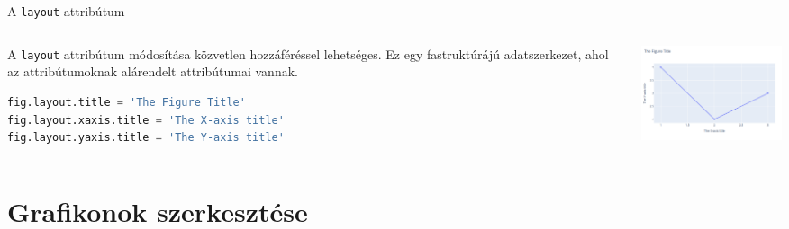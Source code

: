 \documentclass[english, aspectratio=169]{beamer}
\makeatletter
\let\origtableofcontents=\tableofcontents
\def\tableofcontents{\@ifnextchar[{\origtableofcontents}{\gobbletableofcontents}}
\def\gobbletableofcontents#1{\origtableofcontents}
\makeatother
\begin{document}
\begin{frame}[fragile]{A \texttt{layout} attribútum}
	\begin{columns}
		\begin{column}{.5\textwidth}
			A \texttt{layout} attribútum módosítása közvetlen hozzáféréssel lehetséges. Ez egy fastruktúrájú adatszerkezet, ahol az attribútumoknak alárendelt attribútumai vannak.
			\vspace{0.3cm}
			\begin{lstlisting}[language=python]
fig.layout.title = 'The Figure Title'
fig.layout.xaxis.title = 'The X-axis title'
fig.layout.yaxis.title = 'The Y-axis title'				
			\end{lstlisting}
		\end{column}
		\begin{column}{.5\textwidth}
			\begin{center}
				\includegraphics[width=6cm, keepaspectratio]{images/plots_3.png}
			\end{center}
		\end{column}
	\end{columns}
\end{frame}

\section{Grafikonok szerkesztése}

\begin{frame}{}
	\tableofcontents[currentsection]
\end{frame}
\end{document}
